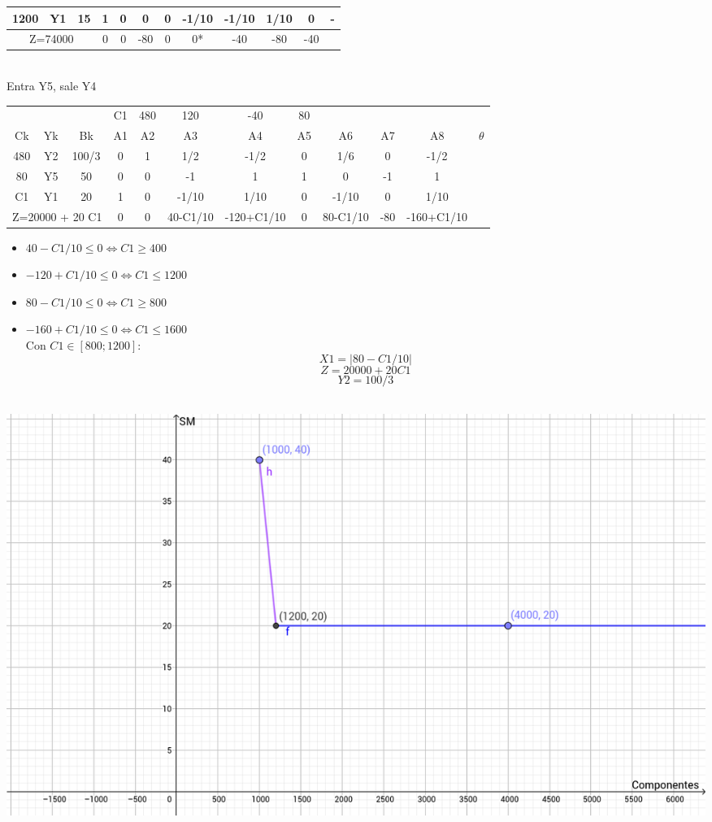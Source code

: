 \documentclass{article}
\begin{document}
\begin{enumerate}
\begin{tabular}{|c  c  c | c  c  c  c  c  c  c  c | c |}
			 1200 & Y1 & 15 & 1 & 0 & 0 & 0 & -1/10 & -1/10 & 1/10 & 0 & -\\ \hline
			 \multicolumn{3}{|c|}{Z=74000} & 0 & 0 & -80 & 0 & 0* & -40 & -80 & -40 &\\ \hline
		\end{tabular}
		\medskip\\
		Entra Y5, sale Y4\\
		\begin{tabular}{|c  c  c | c  c  c  c  c  c  c  c | c |}
			\hline
			 \multicolumn{3}{|c|}{} & C1 & 480 & 120 & -40 & 80 & & & &\\ 
			 Ck & Yk & Bk & A1 & A2 & A3 & A4 & A5 & A6 & A7 & A8 & $\theta$\\ \hline 
			 480 & Y2 & 100/3 & 0 & 1 & 1/2 & -1/2 & 0 & 1/6 & 0 & -1/2 & \\
			 80 & Y5 & 50 & 0 & 0 & -1 & 1 & 1 & 0 & -1 & 1 & \\
			 C1 & Y1 & 20 & 1 & 0 & -1/10 & 1/10 & 0 & -1/10 & 0 & 1/10 & \\ \hline
			 \multicolumn{3}{|c|}{Z=20000 + 20 C1} & 0 & 0 & 40-C1/10 & -120+C1/10 & 0 & 80-C1/10 & -80 & -160+C1/10 &\\ \hline
		\end{tabular}
		\begin{itemize}
				\item $40 - C1/10 \leq 0 \iff C1 \geq 400$
				\item $-120 + C1/10 \leq 0 \iff C1 \leq 1200$
				\item $80 - C1/10 \leq 0 \iff C1 \geq 800$
				\item $-160 + C1/10 \leq 0 \iff C1 \leq 1600$
					\smallskip\\
					Con $C1 \in [800; 1200]$:\\
					$$X1 = |80 - C1/10|$$
					$$Z = 20000 + 20 C1$$
					$$Y2 = 100/3$$
		\end{itemize}
		
     	\smallskip\\
     	\includegraphics{SM.png}
     	\smallskip\\
		

\end{enumerate}
\end{document}
